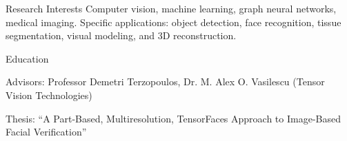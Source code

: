 \documentclass{resume}
\begin{document}
\maketitle
\thispagestyle{empty} %

\vspace{-0.5em}

\begin{component}{Research Interests}
Computer vision, machine learning, graph neural networks, medical imaging.
Specific applications: object detection, face recognition, tissue segmentation, visual modeling, and 3D reconstruction.
\end{component}

\vspace{0.5em}

\begin{component}{Education}

    \hspace{1em} Advisors: Professor Demetri Terzopoulos, Dr. M. Alex O. Vasilescu (Tensor Vision Technologies)

    \hspace{1em} Thesis: ``A Part-Based, Multiresolution, TensorFaces Approach to Image-Based Facial Verification''

\end{component}

\vspace{0.5em}
\end{document}
